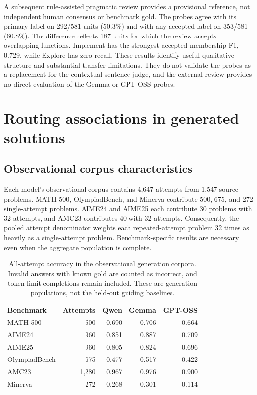 \documentclass[12pt,a4paper,twoside,openright]{book}
\begin{document}
A subsequent rule-assisted pragmatic review provides a provisional reference,
not independent human consensus or benchmark gold. The probes agree with
its primary label on 292/581 units (50.3\%) and with any accepted label on
353/581 (60.8\%). The difference reflects 187 units for which the review
accepts overlapping functions. Implement has the strongest accepted-membership
F1, 0.729, while Explore has zero recall. These results identify useful
qualitative structure and substantial transfer limitations. They do not
validate the probes as a replacement for the contextual sentence judge,
and the external review provides no direct evaluation of the Gemma or
GPT-OSS probes.

\section{Routing associations in generated solutions}
\label{sec:results-correlations}

\subsection{Observational corpus characteristics}

Each model's observational corpus contains 4,647 attempts from 1,547
source problems. MATH-500, OlympiadBench, and Minerva contribute 500, 675,
and 272 single-attempt problems. AIME24 and AIME25 each contribute 30
problems with 32 attempts, and AMC23 contributes 40 with 32 attempts.
Consequently, the pooled attempt denominator weights each repeated-attempt
problem 32 times as heavily as a single-attempt problem. Benchmark-specific
results are necessary even when the aggregate population is complete.

\begin{table}[!ht]
\centering\small
\caption{All-attempt accuracy in the observational generation corpora.
Invalid answers with known gold are counted as incorrect, and token-limit
completions remain included. These are generation populations, not the
held-out guiding baselines.}
\label{tab:res-population}
\begin{tabular}{lrrrr}
\toprule
Benchmark & Attempts & Qwen & Gemma & GPT-OSS \\
\midrule
MATH-500 & 500 & 0.690 & 0.706 & 0.664 \\
AIME24 & 960 & 0.851 & 0.887 & 0.709 \\
AIME25 & 960 & 0.805 & 0.824 & 0.696 \\
OlympiadBench & 675 & 0.477 & 0.517 & 0.422 \\
AMC23 & 1,280 & 0.967 & 0.976 & 0.900 \\
Minerva & 272 & 0.268 & 0.301 & 0.114 \\
\bottomrule
\end{tabular}
\end{table}
\end{document}
